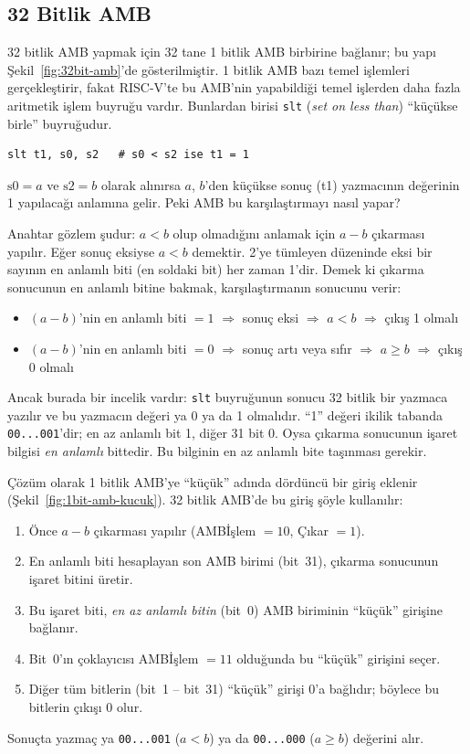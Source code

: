 \subsection{32 Bitlik AMB}
\label{sec:32bit-amb}

32 bitlik AMB yapmak için 32 tane 1 bitlik AMB birbirine bağlanır; bu yapı Şekil~\ref{fig:32bit-amb}'de gösterilmiştir. 1 bitlik AMB bazı temel işlemleri gerçekleştirir, fakat RISC-V'te bu AMB'nin yapabildiği temel işlerden daha fazla aritmetik işlem buyruğu vardır. Bunlardan birisi \texttt{slt} (\emph{set on less than}) ``küçükse birle'' buyruğudur.

\begin{lstlisting}[style=riscv]
slt t1, s0, s2   # s0 < s2 ise t1 = 1
\end{lstlisting}

$\text{s0} = a$ ve $\text{s2} = b$ olarak alınırsa $a$, $b$'den küçükse sonuç (t1) yazmacının değerinin 1 yapılacağı anlamına gelir. Peki AMB bu karşılaştırmayı nasıl yapar?

Anahtar gözlem şudur: $a < b$ olup olmadığını anlamak için $a - b$ çıkarması yapılır. Eğer sonuç eksiyse $a < b$ demektir. 2'ye tümleyen düzeninde eksi bir sayının en anlamlı biti (en soldaki bit) her zaman 1'dir. Demek ki çıkarma sonucunun en anlamlı bitine bakmak, karşılaştırmanın sonucunu verir:
\begin{itemize}
  \item $(a - b)$'nin en anlamlı biti $= 1$ $\Rightarrow$ sonuç eksi $\Rightarrow$ $a < b$ $\Rightarrow$ çıkış 1 olmalı
  \item $(a - b)$'nin en anlamlı biti $= 0$ $\Rightarrow$ sonuç artı veya sıfır $\Rightarrow$ $a \geq b$ $\Rightarrow$ çıkış 0 olmalı
\end{itemize}

Ancak burada bir incelik vardır: \texttt{slt} buyruğunun sonucu 32 bitlik bir yazmaca yazılır ve bu yazmacın değeri ya 0 ya da 1 olmalıdır. ``1'' değeri ikilik tabanda \texttt{00...001}'dir; en az anlamlı bit 1, diğer 31 bit 0. Oysa çıkarma sonucunun işaret bilgisi \emph{en anlamlı} bittedir. Bu bilginin en az anlamlı bite taşınması gerekir.

Çözüm olarak 1 bitlik AMB'ye ``küçük'' adında dördüncü bir giriş eklenir (Şekil~\ref{fig:1bit-amb-kucuk}). 32 bitlik AMB'de bu giriş şöyle kullanılır:
\begin{enumerate}
  \item Önce $a - b$ çıkarması yapılır (AMBİşlem $= 10$, Çıkar $= 1$).
  \item En anlamlı biti hesaplayan son AMB birimi (bit~31), çıkarma sonucunun işaret bitini üretir.
  \item Bu işaret biti, \emph{en az anlamlı bitin} (bit~0) AMB biriminin ``küçük'' girişine bağlanır.
  \item Bit~0'ın çoklayıcısı AMBİşlem $= 11$ olduğunda bu ``küçük'' girişini seçer.
  \item Diğer tüm bitlerin (bit~1 -- bit~31) ``küçük'' girişi 0'a bağlıdır; böylece bu bitlerin çıkışı 0 olur.
\end{enumerate}
Sonuçta yazmaç ya \texttt{00...001} ($a < b$) ya da \texttt{00...000} ($a \geq b$) değerini alır.

